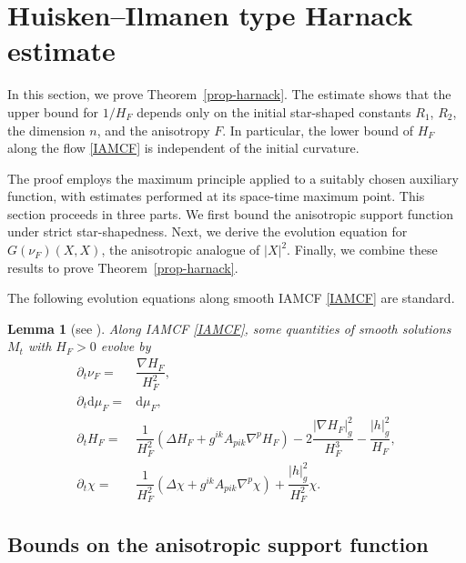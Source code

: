 \documentclass[10pt,a4paper]{amsart}
\newtheorem{lemma}[proposition]{Lemma}
\numberwithin{equation}{section}
\begin{document}
	

	
	\section{Huisken--Ilmanen type Harnack estimate}
	\label{sec3}
	
	In this section, we prove Theorem~\ref{prop-harnack}. The estimate shows that the upper bound for $1/H_F$ depends only on the initial star-shaped constants $R_1$, $R_2$, the dimension $n$, and the anisotropy $F$. In particular, the lower bound of $H_F$ along the flow \eqref{IAMCF} is independent of the initial curvature.

	The proof employs the maximum principle applied to a suitably chosen auxiliary function, with estimates performed at its space-time maximum point. This section proceeds in three parts. We first bound the anisotropic support function under strict star-shapedness. Next, we derive the evolution equation for $G(\nu_F)(X,X)$, the anisotropic analogue of $|X|^2$. Finally, we combine these results to prove Theorem~\ref{prop-harnack}.

	The following evolution equations along smooth IAMCF \eqref{IAMCF} are standard.
	\begin{lemma}[see {\cite[Proposition 4.1]{Xia17}}]
		Along IAMCF \eqref{IAMCF}, some quantities of smooth solutions $M_t$ with $H_F>0$ evolve by
		\begin{align}		
		\partial_t \nu_F = &\dfrac{\nabla H_F}{H_F^2}, \label{equ-nuf} \\
			\partial_t \mathrm{d}\mu_F =  &\mathrm{d}\mu_F, \label{s2.evl-dmu}\\ 
			\partial_t H_F = &\dfrac{1}{H_F^2}\left( \Delta H_F + g^{ik}A_{pik}\nabla^p H_F \right) - 2 \dfrac{|\nabla H_F|_{g}^2}{H_F^3} - \dfrac{|h|_{g}^2}{H_F},
			\label{equ-amc}\\
			\partial_t \chi = &\dfrac{1}{H_F^2}\left( \Delta\chi + g^{ik}A_{pik}\nabla^p \chi \right) + \dfrac{|h|_{g}^2}{H_F^2}\chi.
			\label{equ-asupp} %
        \end{align}	
\end{lemma}
	
	\subsection{Bounds on the anisotropic support function}
\end{document}
